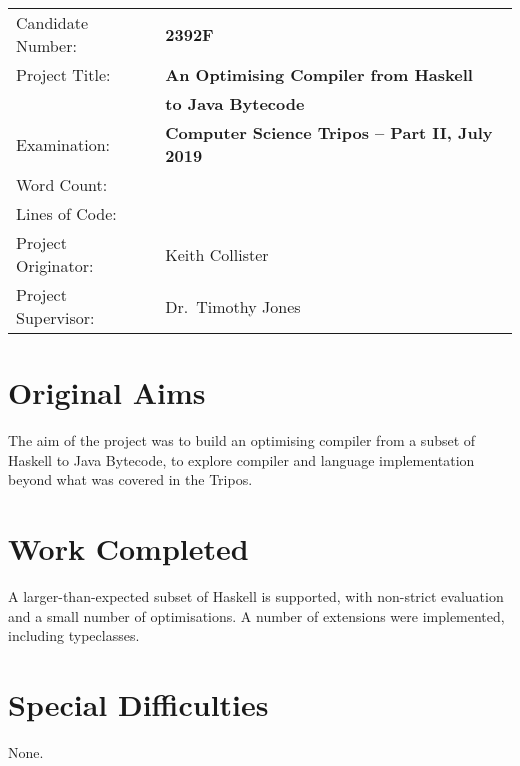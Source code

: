 \documentclass[dissertation.tex]{subfiles}
\begin{document}
{\large
\begin{tabular}{ll}
Candidate Number:   & \textbf{2392F} \\
Project Title:      & \textbf{An Optimising Compiler from Haskell} \\
                    & \textbf{to Java Bytecode} \\
Examination:        & \textbf{Computer Science Tripos -- Part II, July 2019} \\
Word Count:         & \textbf{}\footnotemark[1] \\
Lines of Code:      & \textbf{}\footnotemark[2] \\
Project Originator: & Keith Collister \\
Project Supervisor: & Dr.\ Timothy Jones \\ 
\end{tabular}
}

\section*{Original Aims}
{
    The aim of the project was to build an optimising compiler from a subset of Haskell to Java Bytecode, to explore compiler and language implementation beyond what was covered in the Tripos.
}
\section*{Work Completed}
{
    A larger-than-expected subset of Haskell is supported, with non-strict evaluation and a small number of optimisations. A number of extensions were implemented, including typeclasses.
}
\section*{Special Difficulties}
{
    None.
}

\end{document}
